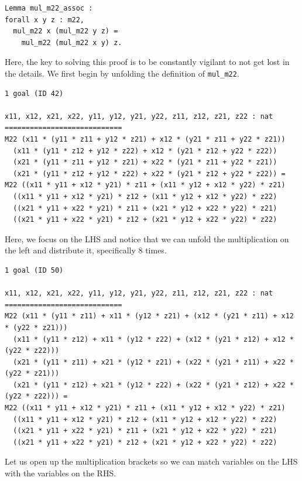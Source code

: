 \documentclass{article}
\begin{document}
\begin{lstlisting}
Lemma mul_m22_assoc :
forall x y z : m22,
  mul_m22 x (mul_m22 y z) =
    mul_m22 (mul_m22 x y) z.
\end{lstlisting}

Here, the key to solving this proof is to be constantly vigilant to not get lost in the details. We first begin by unfolding the definition of \texttt{mul\_m22}.

\begin{lstlisting}
1 goal (ID 42)

x11, x12, x21, x22, y11, y12, y21, y22, z11, z12, z21, z22 : nat
============================
M22 (x11 * (y11 * z11 + y12 * z21) + x12 * (y21 * z11 + y22 * z21))
  (x11 * (y11 * z12 + y12 * z22) + x12 * (y21 * z12 + y22 * z22))
  (x21 * (y11 * z11 + y12 * z21) + x22 * (y21 * z11 + y22 * z21))
  (x21 * (y11 * z12 + y12 * z22) + x22 * (y21 * z12 + y22 * z22)) =
M22 ((x11 * y11 + x12 * y21) * z11 + (x11 * y12 + x12 * y22) * z21)
  ((x11 * y11 + x12 * y21) * z12 + (x11 * y12 + x12 * y22) * z22)
  ((x21 * y11 + x22 * y21) * z11 + (x21 * y12 + x22 * y22) * z21)
  ((x21 * y11 + x22 * y21) * z12 + (x21 * y12 + x22 * y22) * z22)
\end{lstlisting}

Here, we focus on the LHS and notice that we can unfold the multiplication on the left and distribute it, specifically 8 times.

\begin{lstlisting}
1 goal (ID 50)

x11, x12, x21, x22, y11, y12, y21, y22, z11, z12, z21, z22 : nat
============================
M22 (x11 * (y11 * z11) + x11 * (y12 * z21) + (x12 * (y21 * z11) + x12 * (y22 * z21)))
  (x11 * (y11 * z12) + x11 * (y12 * z22) + (x12 * (y21 * z12) + x12 * (y22 * z22)))
  (x21 * (y11 * z11) + x21 * (y12 * z21) + (x22 * (y21 * z11) + x22 * (y22 * z21)))
  (x21 * (y11 * z12) + x21 * (y12 * z22) + (x22 * (y21 * z12) + x22 * (y22 * z22))) =
M22 ((x11 * y11 + x12 * y21) * z11 + (x11 * y12 + x12 * y22) * z21)
  ((x11 * y11 + x12 * y21) * z12 + (x11 * y12 + x12 * y22) * z22)
  ((x21 * y11 + x22 * y21) * z11 + (x21 * y12 + x22 * y22) * z21)
  ((x21 * y11 + x22 * y21) * z12 + (x21 * y12 + x22 * y22) * z22)
\end{lstlisting}

Let us open up the multiplication brackets so we can match variables on the LHS with the variables on the RHS.
\end{document}
